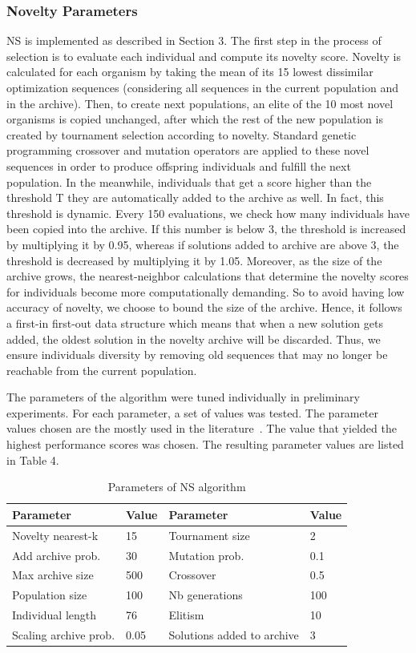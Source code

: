 \subsubsection{Novelty Parameters}
NS is implemented as described in Section 3.
The first step in the process of selection is to evaluate each individual and compute its novelty score. Novelty is calculated for each organism by taking the mean of its 15 lowest dissimilar optimization sequences (considering all sequences in the current population and in the archive). 
Then, to create next populations, an elite of the 10 most novel organisms is copied unchanged, after which the rest of the new population is created by tournament selection according to novelty. Standard genetic programming crossover and mutation operators are applied to these novel sequences in order to produce offspring individuals and fulfill the next population.
In the meanwhile, individuals that get a score higher than the threshold T they are automatically added to the archive as well. 
In fact, this threshold is dynamic. Every 150 evaluations, we check how many individuals have been copied into the archive. If this number is below 3, the threshold is increased by multiplying it by 0.95, whereas if solutions added to archive are above 3, the threshold is decreased by multiplying it by 1.05. 
Moreover, as the size of the archive grows, the nearest-neighbor calculations that determine the novelty scores for individuals become more computationally demanding. So to avoid having low accuracy of novelty, we choose to bound the size of the archive. Hence, it follows a first-in first-out data structure which means that when a new solution gets added, the oldest solution in the novelty archive will be discarded. Thus, we ensure individuals diversity by removing old sequences that may no longer be reachable from the current population.

The parameters of the algorithm were tuned individually in preliminary experiments. For each parameter, a set of values was tested. The parameter values chosen are the mostly used in the literature~\cite{lehman2008exploiting}. The value that yielded the highest performance scores was chosen. The resulting parameter values are listed in Table 4.
\begin{table}
		\caption{Parameters of NS algorithm}
		\begin{tabular}{ l l || l l }
			Parameter & Value & Parameter & Value \\	\hline
			Novelty nearest-k  & 15 &  Tournament size & 2\\ 
			Add archive prob. & 30 &  Mutation prob. & 0.1\\  
			Max archive size & 500 &  Crossover & 0.5  \\  
			Population size & 100 &  Nb generations &  100 \\  
			Individual length & 76 & Elitism & 10  \\ 
			Scaling archive prob. & 0.05 & Solutions added to archive & 3  \\ 
		\end{tabular}
\end{table}

